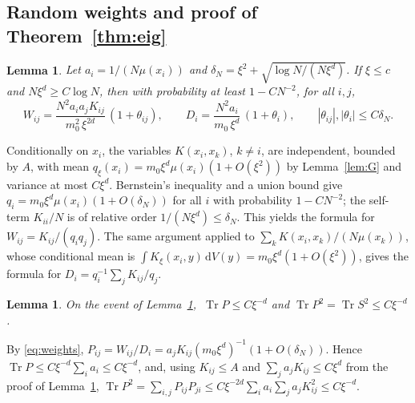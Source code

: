 \documentclass[11pt,a4paper]{article}
\makeatletter
\theoremstyle{stmt}
\newtheorem{lemma}[theorem]{Lemma}
\theoremstyle{defn}
\theoremstyle{rmk}
\renewenvironment{proof}[1][\proofname]{\par\pushQED{\qed}\normalfont\topsep6\p@\@plus6\p@\relax
  \trivlist\item[\hskip\labelsep{\sffamily\itshape\small #1.}]\ignorespaces}{\popQED\endtrivlist\@endpefalse}
\numberwithin{equation}{section}
\DeclareMathOperator{\Tr}{Tr}
\newcommand{\dd}{\mathrm{d}}
\makeatother
\begin{document}
\subsection{Random weights and proof of Theorem~\ref{thm:eig}}

\begin{lemma}\label{lem:weights}
Let $a_i=1/(N\mu(x_i))$ and $\delta_N=\xi^2+\sqrt{\log N/(N\xi^d)}$. If $\xi\le c$ and $N\xi^d\ge C\log N$, then with probability at least $1-CN^{-2}$, for all $i,j$,
\begin{equation}\label{eq:weights}
W_{ij}=\frac{N^2a_ia_jK_{ij}}{m_0^2\,\xi^{2d}}\,(1+\theta_{ij}),\qquad D_i=\frac{N^2a_i}{m_0\,\xi^d}\,(1+\theta_i),\qquad|\theta_{ij}|,|\theta_i|\le C\delta_N .
\end{equation}
\end{lemma}

\begin{proof}
Conditionally on $x_i$, the variables $K(x_i,x_k)$, $k\ne i$, are independent, bounded by $A$, with mean $q_\xi(x_i)=m_0\xi^d\mu(x_i)(1+O(\xi^2))$ by Lemma~\ref{lem:G} and variance at most $C\xi^d$. Bernstein's inequality and a union bound give $q_i=m_0\xi^d\mu(x_i)(1+O(\delta_N))$ for all $i$ with probability $1-CN^{-2}$; the self-term $K_{ii}/N$ is of relative order $1/(N\xi^d)\le\delta_N$. This yields the formula for $W_{ij}=K_{ij}/(q_iq_j)$. The same argument applied to $\sum_kK(x_i,x_k)/(N\mu(x_k))$, whose conditional mean is $\int K_\xi(x_i,y)\,\dd V(y)=m_0\xi^d(1+O(\xi^2))$, gives the formula for $D_i=q_i^{-1}\sum_jK_{ij}/q_j$.
\end{proof}

\begin{lemma}\label{lem:traces}
On the event of Lemma~\ref{lem:weights}, $\ \Tr P\le C\xi^{-d}$ and $\Tr P^2=\Tr S^2\le C\xi^{-d}$.
\end{lemma}

\begin{proof}
By \eqref{eq:weights}, $P_{ij}=W_{ij}/D_i=a_jK_{ij}(m_0\xi^d)^{-1}(1+O(\delta_N))$. Hence $\Tr P\le C\xi^{-d}\sum_ia_i\le C\xi^{-d}$, and, using $K_{ij}\le A$ and $\sum_ja_jK_{ij}\le C\xi^d$ from the proof of Lemma~\ref{lem:weights},
$\Tr P^2=\sum_{i,j}P_{ij}P_{ji}\le C\xi^{-2d}\sum_ia_i\sum_ja_jK_{ij}^2\le C\xi^{-d}$.
\end{proof}
\end{document}
